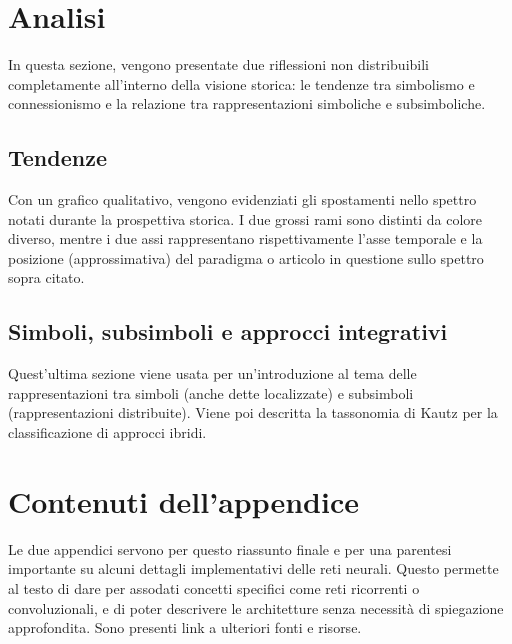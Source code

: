 \documentclass[../main.tex]{subfiles}
\begin{document}
\section{Analisi}
In questa sezione, vengono presentate due riflessioni non distribuibili completamente all'interno della visione storica: le tendenze tra simbolismo e connessionismo e la relazione tra rappresentazioni simboliche e subsimboliche.
\subsection{Tendenze}
Con un grafico qualitativo, vengono evidenziati gli spostamenti nello spettro notati durante la prospettiva storica. I due grossi rami sono distinti da colore diverso, mentre i due assi rappresentano rispettivamente l'asse temporale e la posizione (approssimativa) del paradigma o articolo in questione sullo spettro sopra citato.
\subsection{Simboli, subsimboli e approcci integrativi}
Quest'ultima sezione viene usata per un'introduzione al tema delle rappresentazioni tra simboli (anche dette localizzate) e subsimboli (rappresentazioni distribuite). Viene poi descritta la tassonomia di Kautz per la classificazione di approcci ibridi.

\section{Contenuti dell'appendice}
Le due appendici servono per questo riassunto finale e per una parentesi importante su alcuni dettagli implementativi delle reti neurali. Questo permette al testo di dare per assodati concetti specifici come reti ricorrenti o convoluzionali, e di poter descrivere le architetture senza necessità di spiegazione approfondita. Sono presenti link a ulteriori fonti e risorse.
\end{document}
